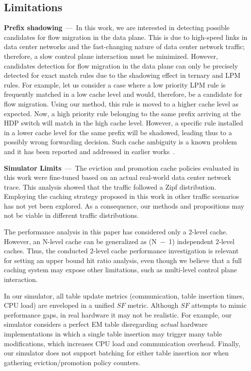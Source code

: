 \subsection{Limitations}\label{sec:method:limitations}

\textbf{Prefix shadowing}~---~In this work, we are interested in detecting possible candidates for flow migration in the data plane.
This is due to high-speed links in data center networks and the fast-changing nature of data center network traffic; therefore, a slow control plane interaction must be minimized.
However, candidates detection for flow migration in the data plane can only be precisely detected for exact match rules due to the shadowing effect in ternary and LPM rules.
For example, let us consider a case where a low priority LPM rule is frequently matched in a low cache level and would, therefore, be a candidate for flow migration.
Using our method, this rule is moved to a higher cache level as expected.
Now, a high priority rule belonging to the same prefix arriving at the HDP switch will match in the high cache level.
However, a specific rule installed in a lower cache level for the same prefix will be shadowed, leading thus to a possibly wrong forwarding decision.   
Such cache ambiguity is a known problem and it has been reported and addressed in earlier works~\cite{Degermark:1997, Katta:2014}.

\textbf{Simulator Limits}~---~The eviction and promotion cache policies evaluated in this work were fine-tuned based on an actual real-world data center network trace.
This analysis showed that the traffic followed a Zipf distribution.
Employing the caching strategy proposed in this work in other traffic scenarios has not yet been explored.
As a consequence, our methods and propositions may not be viable in different traffic distributions.

The performance analysis in this paper has considered only a 2-level cache.
However, an N-level cache can be generalized as (N~$-$~1) independent 2-level caches.
Thus, the conducted 2-level cache performance investigation is relevant for setting an upper bound hit ratio analysis, even though we believe that a full caching system may expose other limitations, such as multi-level control plane interaction.

In our simulator, all table update metrics (communication, table insertion times, CPU load) are enveloped in a unified $SF$ metric.
Although $SF$ attempts to mimic performance gaps, in real hardware it may not be realistic.
For example, our simulator considers a perfect EM table disregarding \textit{actual} hardware implementations in which a single table insertion may trigger many table modifications, which increases CPU load and communication overhead.
Finally, our simulator does not support batching for either table insertion nor when gathering eviction/promotion policy counters.

